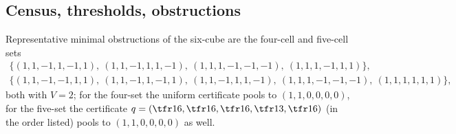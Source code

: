 \subsection{Census, thresholds, obstructions}
\begin{table}[H]\centering\small
\caption{Level census for $m=4,5,6$ (main Table~ with all levels).}\label{tab:S4census}

\end{table}
\begin{table}[H]\centering\small
\caption{Threshold histograms over all survivable sets, number of sets with $V=\tfrac52$ exactly, and number of thresholds left uncertified by the two-sided scheme.}\label{tab:S4thr}

\end{table}
\begin{table}[H]\centering\small
\caption{Obstructions: far pairs by distance with their values, admissible non-survivable sets, minimal obstructions inside the admissible family by size and value, and the largest value of any minimal obstruction (main Corollary~).}\label{tab:S4obs}

\end{table}
Representative minimal obstructions of the six-cube are the four-cell and five-cell sets
\begin{gather*}
\{(1,1,-1,1,-1,1),\ (1,1,-1,1,1,-1),\ (1,1,1,-1,-1,-1),\ (1,1,1,-1,1,1)\},\\
\{(1,1,-1,-1,1,1),\ (1,1,-1,1,-1,1),\ (1,1,-1,1,1,-1),\ (1,1,1,-1,-1,-1),\ (1,1,1,1,1,1)\},
\end{gather*}
both with $V=2$; for the four-set the uniform certificate pools to $(1,1,0,0,0,0)$, for the five-set the certificate $q=(\tfr16,\tfr16,\tfr16,\tfr13,\tfr16)$ (in the order listed) pools to $(1,1,0,0,0,0)$ as well.
